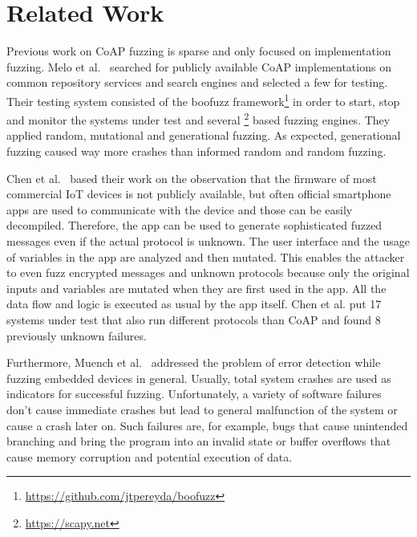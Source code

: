 \section{Related Work}
\label{section:related_work}


Previous work on CoAP fuzzing is sparse and only focused on implementation fuzzing. Melo et al.~\cite{Melo2017RobustnessTO} searched for publicly available CoAP implementations on common repository services and search engines and selected a few for testing. Their testing system consisted of the boofuzz framework\footnote{\url{https://github.com/jtpereyda/boofuzz}} in order to start, stop and monitor the systems under test and several \scapy\footnote{\url{https://scapy.net}} based fuzzing engines. They applied random, mutational and generational fuzzing. As expected, generational fuzzing caused way more crashes than informed random and random fuzzing.

Chen et al.~\cite{chen2018ndss} based their work on the observation that the firmware of most commercial IoT devices is not publicly available, but often official smartphone apps are used to communicate with the device and those can be easily decompiled. Therefore, the app can be used to generate sophisticated fuzzed messages even if the actual protocol is unknown. The user interface and the usage of variables in the app are analyzed and then mutated. This enables the attacker to even fuzz encrypted messages and unknown protocols because only the original inputs and variables are mutated when they are first used in the app. All the data flow and logic is executed as usual by the app itself. Chen et al. put 17 systems under test that also run different protocols than CoAP and found 8 previously unknown failures.

Furthermore, Muench et al.~\cite{EURECOM+5417} addressed the problem of error detection while fuzzing embedded devices in general. Usually, total system crashes are used as indicators for successful fuzzing. Unfortunately, a variety of software failures don't cause immediate crashes but lead to general malfunction of the system or cause a crash later on. Such failures are, for example, bugs that cause unintended branching and bring the program into an invalid state or buffer overflows that cause memory corruption and potential execution of data.

